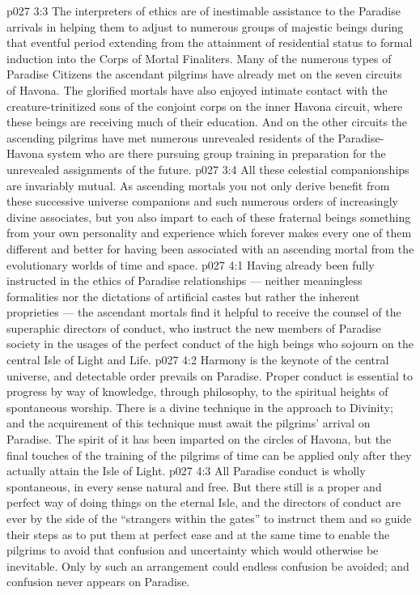 \vs p027 3:3 The interpreters of ethics are of inestimable assistance to the Paradise arrivals in helping them to adjust to numerous groups of majestic beings during that eventful period extending from the attainment of residential status to formal induction into the Corps of Mortal Finaliters. Many of the numerous types of Paradise Citizens the ascendant pilgrims have already met on the seven circuits of Havona. The glorified mortals have also enjoyed intimate contact with the creature\hyp{}trinitized sons of the conjoint corps on the inner Havona circuit, where these beings are receiving much of their education. And on the other circuits the ascending pilgrims have met numerous unrevealed residents of the Paradise\hyp{}Havona system who are there pursuing group training in preparation for the unrevealed assignments of the future.
\vs p027 3:4 All these celestial companionships are invariably mutual. As ascending mortals you not only derive benefit from these successive universe companions and such numerous orders of increasingly divine associates, but you also impart to each of these fraternal beings something from your own personality and experience which forever makes every one of them different and better for having been associated with an ascending mortal from the evolutionary worlds of time and space.
\vs p027 4:1 Having already been fully instructed in the ethics of Paradise relationships --- neither meaningless formalities nor the dictations of artificial castes but rather the inherent proprieties --- the ascendant mortals find it helpful to receive the counsel of the superaphic directors of conduct, who instruct the new members of Paradise society in the usages of the perfect conduct of the high beings who sojourn on the central Isle of Light and Life.
\vs p027 4:2 Harmony is the keynote of the central universe, and detectable order prevails on Paradise. Proper conduct is essential to progress by way of knowledge, through philosophy, to the spiritual heights of spontaneous worship. There is a divine technique in the approach to Divinity; and the acquirement of this technique must await the pilgrims’ arrival on Paradise. The spirit of it has been imparted on the circles of Havona, but the final touches of the training of the pilgrims of time can be applied only after they actually attain the Isle of Light.
\vs p027 4:3 All Paradise conduct is wholly spontaneous, in every sense natural and free. But there still is a proper and perfect way of doing things on the eternal Isle, and the directors of conduct are ever by the side of the “strangers within the gates” to instruct them and so guide their steps as to put them at perfect ease and at the same time to enable the pilgrims to avoid that confusion and uncertainty which would otherwise be inevitable. Only by such an arrangement could endless confusion be avoided; and confusion never appears on Paradise.
